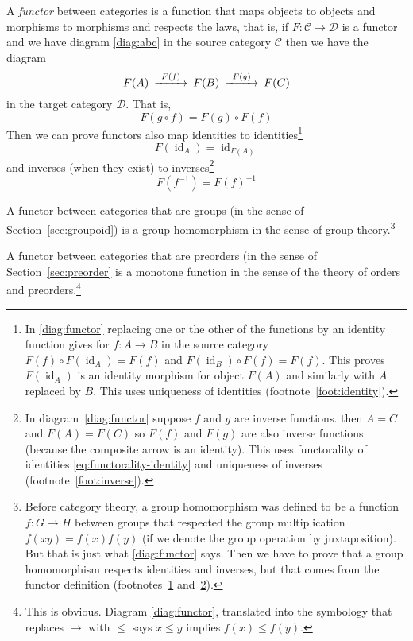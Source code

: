 \documentclass[11pt]{article}
\DeclareMathOperator{\idfun}{id}
\begin{document}
A \emph{functor} between categories is a function that maps
objects to objects and morphisms to morphisms and respects the laws,
that is, if $F : \mathcal{C} \to \mathcal{D}$ is a functor
and we have diagram \eqref{diag:abc}
in the source category $\mathcal{C}$ then we have the diagram
\begin{equation}
\label{diag:functor}
\begin{CD}
   F(A) @>{F(f)}>> F(B) @>{F(g)}>> F(C)
\end{CD}
\end{equation}
in the target category $\mathcal{D}$. That is,
$$
   F(g \circ f) = F(g) \circ F(f)
$$
Then we can prove functors also map
identities to identities\footnote{In \eqref{diag:functor} replacing
one or the other of the functions by an identity function gives
for $f : A \to B$ in the source category
$F(f) \circ F(\idfun_A) = F(f)$ and
$F(\idfun_B) \circ F(f) = F(f)$.  This proves $F(\idfun_A)$ is an
identity morphism for object $F(A)$ and similarly with $A$ replaced by $B$.
This uses uniqueness of identities
(footnote~\ref{foot:identity}).\label{foot:functor-identity}}
\begin{equation} \label{eq:functorality-identity}
   F(\idfun_A) = \idfun_{F(A)}
\end{equation}
and inverses (when they exist) to inverses\footnote{In
diagram~\eqref{diag:functor} suppose $f$ and $g$ are inverse functions.
then $A = C$ and $F(A) = F(C)$ so $F(f)$ and $F(g)$ are also inverse functions
(because the composite arrow is an identity).
This uses functorality of identities \eqref{eq:functorality-identity}
and uniqueness of inverses
(footnote~\ref{foot:inverse}).\label{foot:functor-inverse}}
$$
   F(f^{-1}) = F(f)^{-1}
$$

A functor between categories that are groups
(in the sense of Section~\ref{sec:groupoid})
is a group homomorphism in the sense of group theory.\footnote{Before
category theory, a group homomorphism was defined to be
a function $f : G \to H$ between groups that respected the group
multiplication $f(x y) = f(x) f(y)$ (if we denote the group operation by
juxtaposition).  But that is just what \eqref{diag:functor} says.
Then we have to prove that a group homomorphism respects identities
and inverses, but that comes from the functor definition
(footnotes~\ref{foot:functor-identity} and~\ref{foot:functor-inverse}).}

A functor between categories that are preorders (in the sense of
Section~\ref{sec:preorder} is a monotone function in the sense of the
theory of orders and preorders.\footnote{This is obvious.
Diagram \eqref{diag:functor}, translated into the symbology that replaces
$\to$ with $\le$ says $x \le y$ implies $f(x) \le f(y)$.}
\end{document}
